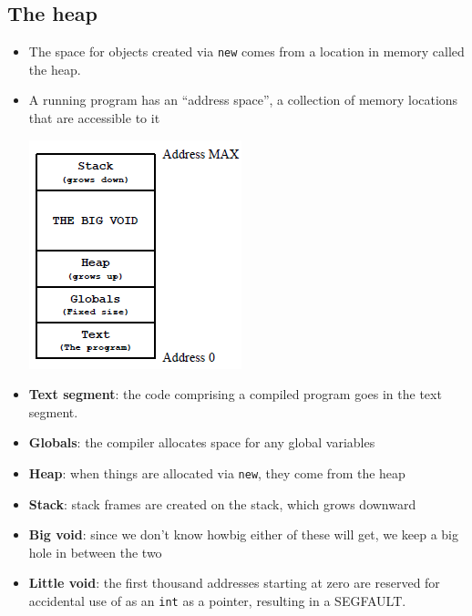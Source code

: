 \subsection{The heap}
\begin{itemize}
	\item The space for objects created via \lstinline[style=C++]{new} comes from a location in memory called the heap.
	\item A running program has an ``address space'', a collection of memory locations that are accessible to it
	\begin{center}
		\includegraphics{sections/lec15/mem2.png}
	\end{center}
	\item \textbf{Text segment}: the code comprising a compiled program goes in the text segment.
	\item \textbf{Globals}: the compiler allocates space for any global variables
	\item \textbf{Heap}: when things are allocated via \lstinline[style=C++]{new}, they come from the heap
	\item \textbf{Stack}: stack frames are created on the stack, which grows downward
	\item \textbf{Big void}: since we don't know howbig either of these will get, we keep a big hole in between the two
	\item \textbf{Little void}: the first thousand addresses starting at zero are reserved for accidental use of as an \lstinline[style=C++]{int} as a pointer, resulting in a SEGFAULT.
\end{itemize}

